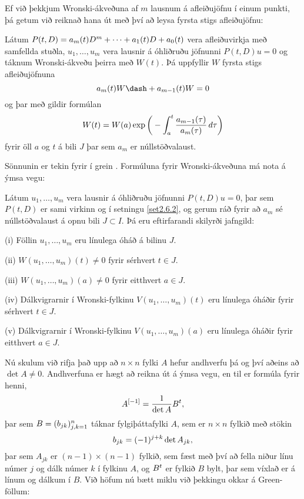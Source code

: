 Ef við þekkjum Wronski-ákveðuna af $m$ lausnum á afleiðujöfnu í einum
punkti, þá getum við reiknað hana út með því að leysa fyrsta stigs
afleiðujöfnu: 

\begin{se}\label{set2.6.2}
Látum
$P(t,D)=a_m(t)D\sp m+\cdots+a_1(t)D+a_0(t)$ vera afleiðuvirkja með
samfellda stuðla, $u_1,\dots,u_m$ vera lausnir á óhliðruðu jöfnunni
$P(t,D)u=0$ og táknum  Wronski-ákveðu þeirra með $W(t)$.  Þá
uppfyllir $W$ fyrsta stigs afleiðujöfnuna
\begin{equation*}a_m(t) W\dash+a_{m-1}(t)W=0 \label{2.6.3}
\end{equation*}
og þar með gildir formúlan
 \begin{equation*}W(t)=W(a)\exp\bigg(-\int_a\sp t\dfrac{a_{m-1}(\tau)}{a_m(\tau)}\,
d\tau\bigg) \label{2.6.4}
 \end{equation*}
fyrir öll $a$ og $t$ á bili $J$ þar sem $a_m$ er núllstöðvalaust.
\end{se}

Sönnunin er tekin fyrir í grein .
Formúluna fyrir Wronski-ákveðuna má nota á ýmsa vegu:

\begin{se}
  Látum $u_1,\dots,u_m$ vera lausnir á óhliðruðu jöfnunni
$P(t,D)u=0$, þar sem $P(t,D)$ er sami virkinn og í setningu
\ref{set2.6.2}, og gerum ráð fyrir að $a_m$ sé núllstöðvalaust á opnu bili
$J\subset I$.  Þá eru eftirfarandi skilyrði jafngild:

\item{(i)}  Föllin $u_1,\dots,u_m$ eru línulega óháð á bilinu $J$.

\item{(ii)} $W(u_1,\dots,u_m)(t)\neq 0$ fyrir sérhvert $t\in J$.

\item{(iii)} $W(u_1,\dots,u_m)(a)\neq 0$ fyrir eitthvert $a\in J$.

\item{(iv)}  Dálkvigrarnir í Wronski-fylkinu $V(u_1,\dots,u_m)(t)$  eru
línulega óháðir fyrir sérhvert $t\in J$.

\item{(v)}  Dálkvigrarnir í Wronski-fylkinu $V(u_1,\dots,u_m)(a)$  eru
línulega óháðir fyrir eitthvert $a\in J$.
\end{se}

Nú skulum við rifja það upp að $n\times n$ fylki $A$ hefur andhverfu
þá og því aðeins að $\det A\neq 0$.  Andhverfuna er hægt að reikna út
á ýmsa vegu, en til er formúla fyrir henni,
 \begin{equation*}A\sp{[-1]}=\dfrac 1{\det A}B\sp t,\label{2.6.7}
 \end{equation*}
þar sem $B=(b_{jk})_{j,k=1}\sp n$ táknar fylgiþáttafylki $A$, sem 
er $n\times n$ fylkið með stökin
 \begin{equation*}b_{jk}=(-1)\sp{j+k}\det A_{jk},\label{2.6.8}
 \end{equation*}
þar sem $A_{jk}$ er $(n-1)\times (n-1)$ fylkið, sem fæst með því að
fella niður línu númer $j$ og dálk númer $k$ í fylkinu $A$, og $B\sp
t$ er fylkið $B$ bylt, þar sem víxlað er á línum og dálkum í $B$.
Við höfum nú bætt miklu við þekkingu okkar á Green-föllum:


